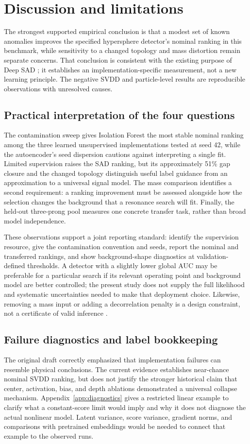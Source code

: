 \documentclass[reprint,aps,pra,amsmath,amssymb,floatfix,raggedbottom]{revtex4-2}
\begin{document}
\section{Discussion and limitations}
The strongest supported empirical conclusion is that a modest set of known anomalies improves the specified hypersphere detector's nominal ranking in this benchmark, while sensitivity to a changed topology and mass distortion remain separate concerns. That conclusion is consistent with the existing purpose of Deep SAD \cite{sad}; it establishes an implementation-specific measurement, not a new learning principle. The negative SVDD and particle-level results are reproducible observations with unresolved causes.

\subsection{Practical interpretation of the four questions}
The contamination sweep gives Isolation Forest the most stable nominal ranking among the three learned unsupervised implementations tested at seed 42, while the autoencoder's seed dispersion cautions against interpreting a single fit. Limited supervision raises the SAD ranking, but its approximately 51\% gap closure and the changed topology distinguish useful label guidance from an approximation to a universal signal model. The mass comparison identifies a second requirement: a ranking improvement must be assessed alongside how the selection changes the background that a resonance search will fit. Finally, the held-out three-prong pool measures one concrete transfer task, rather than broad model independence.

These observations support a joint reporting standard: identify the supervision resource, give the contamination convention and seeds, report the nominal and transferred rankings, and show background-shape diagnostics at validation-defined thresholds. A detector with a slightly lower global AUC may be preferable for a particular search if its relevant operating point and background model are better controlled; the present study does not supply the full likelihood and systematic uncertainties needed to make that deployment choice. Likewise, removing a mass input or adding a decorrelation penalty is a design constraint, not a certificate of valid inference \cite{disco}.

\subsection{Failure diagnostics and label bookkeeping}
The original draft correctly emphasized that implementation failures can resemble physical conclusions. The current evidence establishes near-chance nominal SVDD ranking, but does not justify the stronger historical claim that center, activation, bias, and depth ablations demonstrated a universal collapse mechanism. Appendix~\ref{app:diagnostics} gives a restricted linear example to clarify what a constant-score limit would imply and why it does not diagnose the actual nonlinear model. Latent variance, score variance, gradient norms, and comparisons with pretrained embeddings would be needed to connect that example to the observed runs.
\end{document}

